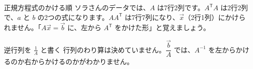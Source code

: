 \begin{tsumazuki}{正規方程式のかける順}
ソラさんのデータでは、$A$ は7行2列です。$A^{\mathsf T}A$ は2行2列で、$a$ と $b$ の2つの式になります。$AA^{\mathsf T}$ は7行7列になり、$\vec x$（2行1列）にかけられません。「$A\vec x=\vec b$ に、左から $A^{\mathsf T}$ をかけた形」と覚えましょう。
\end{tsumazuki}
\begin{tsumazuki}{逆行列を $\frac{1}{A}$ と書く}
行列のわり算は決めていません。$\dfrac{\vec b}{A}$ では、$A^{-1}$ を左からかけるのか右からかけるのかがわかりません。
\end{tsumazuki}

